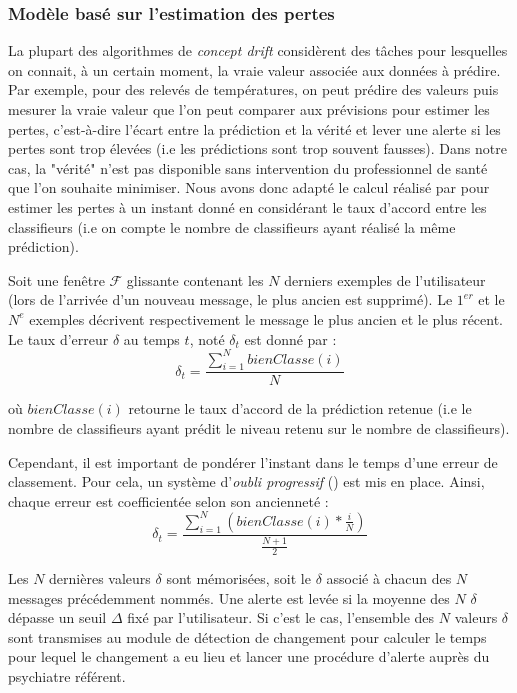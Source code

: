 \subsubsection{Modèle basé sur l'estimation des pertes}\label{pertes}

La plupart des algorithmes de \emph{concept drift} \cite{Gama2014} considèrent des tâches pour lesquelles on connait, à un certain moment, la vraie valeur associée aux données à prédire. Par exemple, pour des relevés de températures, on peut prédire des valeurs puis mesurer la vraie valeur que l'on peut comparer aux prévisions pour estimer les pertes, c'est-à-dire l'écart entre la prédiction et la vérité et lever une alerte si les pertes sont trop élevées (i.e les prédictions sont trop souvent fausses). Dans notre cas, la "vérité" n'est pas disponible sans intervention du professionnel de santé que l'on souhaite minimiser. Nous avons donc adapté le calcul réalisé par \cite{Bach2010} pour estimer les pertes à un instant donné en considérant le taux d'accord entre les classifieurs (i.e on compte le nombre de classifieurs ayant réalisé la même prédiction).

Soit une fenêtre $\mathcal{F}$ glissante contenant les $N$ derniers exemples de l'utilisateur (lors de l'arrivée d'un nouveau message, le plus ancien est supprimé). Le $1^{er}$ et le $N^e$ exemples décrivent respectivement le message le plus ancien et le plus récent.
Le taux d'erreur $\delta$ au temps $t$, noté $\delta_t$ est donné par :
\[
\delta_t = \frac{\sum\limits_{i=1}^N bienClasse(i)}{N}
\]

où $bienClasse(i)$ retourne le taux d'accord de la prédiction retenue (i.e le nombre de classifieurs ayant prédit le niveau retenu sur le nombre de classifieurs). 

Cependant, il est important de pondérer l'instant dans le temps d'une erreur de classement. Pour cela, un système d'\emph{oubli progressif} (\cite{Chandramouli}) est mis en place. Ainsi, chaque erreur est coefficientée selon son ancienneté :
\[
\delta_t = \frac{\sum\limits_{i=1}^N (bienClasse(i)*\frac{i}{N})}{\frac{N+1}{2}}
\]

Les $N$ dernières valeurs $\delta$ sont mémorisées, soit le $\delta$ associé à chacun des $N$ messages précédemment nommés. 
Une alerte est levée si la moyenne des $N$ $\delta$ dépasse un seuil $\Delta$ fixé par l'utilisateur. Si c'est le cas, l'ensemble des $N$ valeurs $\delta$ sont transmises au module de détection de changement pour calculer le temps pour lequel le changement a eu lieu et lancer une procédure d'alerte auprès du psychiatre référent. 

